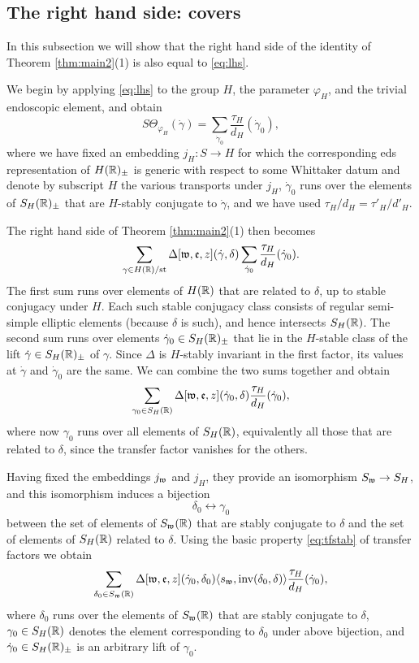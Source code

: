 \documentclass{article}
\theoremstyle{definition}
\numberwithin{equation}{section}
\renewcommand{\-}{\hyp{}}
\begin{document}
\subsection{The right hand side: covers} \label{sub:rhs_cover}

In this subsection we will show that the right hand side of the identity of Theorem \ref{thm:main2}(1) is also equal to \eqref{eq:lhs}.

We begin by applying \eqref{eq:lhs} to the group $H$, the parameter $\varphi_H$, and the trivial endoscopic element, and obtain
\[ S\Theta_{\varphi_H}(\dot\gamma) = \sum_{\dot\gamma_0} \frac{\tau_H}{d_{H}}(\dot\gamma_0), \]
where we have fixed an embedding $j_H : S \to H$ for which the corresponding eds representation of $H(\mathbb{R})_\pm$ is generic with respect to some Whittaker datum and denote by subscript $H$ the various transports under $j_H$, $\dot\gamma_0$ runs over the elements of $S_H(\mathbb{R})_\pm$ that are $H$-stably conjugate to $\dot\gamma$, and we have used $\tau_H/d_H=\tau'_H/d'_H$.

The right hand side of Theorem \ref{thm:main2}(1) then becomes
\[ \sum_{\gamma \in H(\mathbb{R})/\textrm{st}} \Delta[\mathfrak{w},\mathfrak{e},z](\dot\gamma,\delta)\sum_{\dot\gamma_0} \frac{\tau_H}{d_{H}}(\dot\gamma_0). \]
The first sum runs over elements of $H(\mathbb{R})$ that are related to $\delta$, up to stable conjugacy under $H$. Each such stable conjugacy class consists of regular semi-simple elliptic elements (because $\delta$ is such), and hence intersects $S_H(\mathbb{R})$. The second sum runs over elements $\dot\gamma_0 \in S_H(\mathbb{R})_\pm$ that lie in the $H$-stable class of the lift $\dot\gamma \in S_H(\mathbb{R})_\pm$ of $\gamma$. Since $\Delta$ is $H$-stably invariant in the first factor, its values at $\dot\gamma$ and $\dot\gamma_0$ are the same. We can combine the two sums together and obtain
\[ \sum_{\gamma_0 \in S_H(\mathbb{R})} \Delta[\mathfrak{w},\mathfrak{e},z](\dot\gamma_0,\delta) \frac{\tau_H}{d_{H}}(\dot\gamma_0), \]
where now $\gamma_0$ runs over all elements of $S_H(\mathbb{R})$, equivalently all those that are related to $\delta$, since the transfer factor vanishes for the others.


Having fixed the embeddings $j_{\mathfrak{w}}$ and $j_H$, they provide an isomorphism $S_{\mathfrak{w}} \to S_H$, and this isomorphism induces a bijection
\[ \delta_0 \leftrightarrow \gamma_0 \]
between the set of elements of $S_{\mathfrak{w}}(\mathbb{R})$ that are stably conjugate to $\delta$ and the set of elements of $S_H(\mathbb{R})$ related to $\delta$. Using the basic property \eqref{eq:tfstab} of transfer factors we obtain
\begin{equation} \label{eq:rhs1}
\sum_{\delta_0 \in S_{\mathfrak{w}}(\mathbb{R})} \Delta[\mathfrak{w},\mathfrak{e},z](\dot\gamma_0,\delta_0)\langle s_{\mathfrak{w}},\textrm{inv}(\delta_0,\delta)\rangle \frac{\tau_H}{d_{H}}(\dot\gamma_0),
\end{equation}
where $\delta_0$ runs over the elements of $S_{\mathfrak{w}}(\mathbb{R})$ that are stably conjugate to $\delta$, $\gamma_0 \in S_H(\mathbb{R})$ denotes the element corresponding to $\delta_0$ under above bijection, and $\dot\gamma_0 \in S_H(\mathbb{R})_\pm$ is an arbitrary lift of $\gamma_0$.
\end{document}
